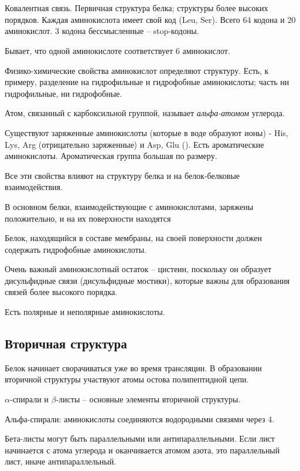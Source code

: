 \documentclass[main.tex]{subfiles}
\begin{document}
\section{   }
Ковалентная связь.
Первичная структура белка; структуры более высоких порядков.
Каждая аминокислота имеет свой код (Leu, Ser).
Всего 64 кодона и 20 аминокислот.
3 кодона бессмысленные -- stop-кодоны.

Бывает, что одной аминокислоте соответствует 6 аминокислот.

Физико-химические свойства аминокислот определяют структуру.
Есть, к примеру, разделение на гидрофильные и гидрофобные аминокислоты; часть ни гидрофильные, ни гидрофобные.

Атом, связанный с карбоксильной группой, называет \emph{альфа-атомом} углерода.

Существуют заряженные аминокислоты (которые в воде образуют ионы) - His, Lys, Arg (отрицательно заряженные) и Asp, Glu ().
Есть ароматические аминокислоты.
Ароматическая группа большая по размеру.

Все эти свойства влияют на структуру белка и на белок-белковые взаимодействия.

В основном белки, взаимодействующие с аминокислотами, заряжены положительно, и на их поверхности находятся 

Белок, находящийся в составе мембраны, на своей поверхности должен содержать гидрофобные аминокислоты.

Очень важный аминокислотный остаток -- цистеин, поскольку он образует дисульфидные связи (дисульфидные мостики), которые важны для образования связей более высокого порядка.

Есть полярные и неполярные аминокислоты.

\subsection{Вторичная структура}

Белок начинает сворачиваться уже во время трансляции.
В образовании вторичной структуры участвуют атомы остова полипептидной цепи.

$\alpha$-спирали и $\beta$-листы -- основные элементы вторичной структуры.

Альфа-спирали: аминокислоты соединяются водородными связями через 4.

Бета-листы могут быть параллельными или антипараллельными.
Если лист начинается с атома углерода и оканчивается атомом азота, это параллельный лист, иначе антипараллельный.
\end{document}
